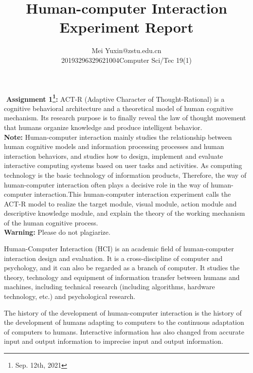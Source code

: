 \documentclass[twoside,11pt]{article}
\makeatletter
\newcommand\assignmentNumber{1}                             %
\newcommand\studentName{Mei Yuxin}                  %
\newcommand\studentEmail{2019329621004@zstu.edu.cn}          %
\newcommand\studentNumber{20193296329621004}                %
\newcommand\studentClass{Computer Sci/Tec 19(1)}
\newenvironment{boxedlaw}[1]
{\begin{Sbox}\begin{minipage}{#1‎}‎\setcounter{mpfootnote}{\value{footnote}}}
		{\end{minipage}\end{Sbox}\begin{center}\shadowbox{\TheSbox}
		\setcounter{footnote}{\value{mpfootnote}}\end{center}}
\makeatother
\begin{document}
    	
\begin{boxedlaw}{\textwidth}
	\vspace*{2mm}\textbf{Assignment \assignmentNumber\footnote{Sep. 12th, 2021 }:} ACT-R (Adaptive Character of Thought-Rational) is a cognitive behavioral architecture and a theoretical model of human cognitive mechanism. Its research purpose is to finally reveal the law of thought movement that humans organize knowledge and produce intelligent behavior.\\ 
	\vspace*{2mm}\textbf{ Note:} Human-computer interaction mainly studies the relationship between human cognitive models and information processing processes and human interaction behaviors, and studies how to design, implement and evaluate interactive computing systems based on user tasks and activities. As computing technology is the basic technology of information products, Therefore, the way of human-computer interaction often plays a decisive role in the way of human-computer interaction.This human-computer interaction experiment calls the ACT-R model to realize the target module, visual module, action module and descriptive knowledge module, and explain the theory of the working mechanism of the human cognitive process.\\
	\vspace*{1mm}\textbf{ Warning:} Please do not  plagiarize.
\end{boxedlaw}
	\title{Human-computer Interaction Experiment Report}

\author{\name \studentName \email \studentEmail \\
	\studentNumber \class  \studentClass
	\addr 
}
    
    \maketitle


Human-Computer Interaction (HCI) is an academic field of human-computer interaction design and evaluation. It is a cross-discipline of computer and psychology, and it can also be regarded as a branch of computer. It studies the theory, technology and equipment of information transfer between humans and machines, including technical research (including algorithms, hardware technology, etc.) and psychological research.


The history of the development of human-computer interaction is the history of the development of humans adapting to computers to the continuous adaptation of computers to humans. Interactive information has also changed from accurate input and output information to imprecise input and output information.
\end{document}

